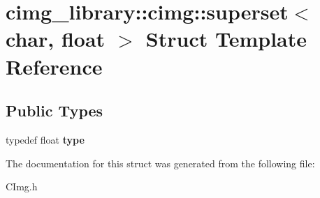 \hypertarget{structcimg__library_1_1cimg_1_1superset_3_01char_00_01float_01_4}{\section{cimg\-\_\-library\-:\-:cimg\-:\-:superset$<$ char, float $>$ Struct Template Reference}
\label{structcimg__library_1_1cimg_1_1superset_3_01char_00_01float_01_4}
}
\subsection*{Public Types}
\begin{DoxyCompactItemize}
\item 
\hypertarget{structcimg__library_1_1cimg_1_1superset_3_01char_00_01float_01_4_a1c783c8bffe6a7dc88da77e518ad99d9}{typedef float {\bfseries type}}\label{structcimg__library_1_1cimg_1_1superset_3_01char_00_01float_01_4_a1c783c8bffe6a7dc88da77e518ad99d9}

\end{DoxyCompactItemize}


The documentation for this struct was generated from the following file\-:\begin{DoxyCompactItemize}
\item 
C\-Img.\-h\end{DoxyCompactItemize}
